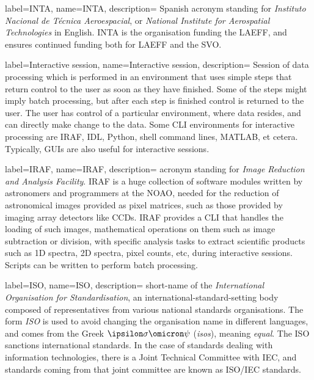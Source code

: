 {
    label={INTA},
    name={INTA},
    description={
    	Spanish acronym standing for \emph{Instituto Nacional de
        Técnica Aeroespacial}, or \emph{National Institute for
        Aerospatial Technologies} in English. INTA is the organisation
        funding the \gls{LAEFF}, and ensures continued funding both for
        LAEFF and the \gls{SVO}.
    }
}

{
    label={Interactive session},
    name={Interactive session},
    description={
    	Session of data processing which is performed in an environment
        that uses simple steps that return control to the user as soon
        as they have finished. Some of the steps might imply \gls{batch
        processing}, but after each step is finished control is
        returned to the user. The user has control of a particular
        environment, where data resides, and can directly make change
        to the data. Some \gls{CLI} environments for interactive
        processing are \gls{IRAF}, \gls{IDL}, \gls{Python}, \gls{shell}
        command lines, \gls{MATLAB}, et cetera.
		Typically, \gls{GUI}s are also
        useful for interactive sessions.
    }
}

{
    label={IRAF},
    name={IRAF},
    description={
    	acronym standing for \emph{Image Reduction and Analysis
        Facility}. IRAF is a huge collection of software modules
        written by astronomers and programmers at the \gls{NOAO},
        needed for the \gls{reduction} of astronomical images provided
        as pixel matrices, such as those provided by imaging array
        detectors like CCDs. IRAF provides a \gls{CLI} that handles the
        loading of such images, mathematical operations on them such as
        image subtraction or division, with specific analysis tasks to
        extract scientific products such as 1D spectra, 2D spectra,
        pixel counts, etc, during \gls{interactive sessions}. Scripts
        can be written to perform \gls{batch processing}.
    }
}

{
    label={ISO},
    name={ISO},
    description={
    	short-name of the \emph{International Organisation for
        Standardisation}, an international-standard-setting body
        composed of representatives from various national standards
        organisations. The form \emph{ISO} is used to avoid changing
        the organisation name in different languages, and comes from
        the Greek $\ipsilon\sigma\omicron\psi$ (\emph{isos}), meaning
        \emph{equal}. The ISO sanctions international standards. In the
        case of standards dealing with information technologies, there
        is a Joint Technical Committee with \gls{IEC}, and standards
        coming from that joint committee are known as ISO/IEC
        standards.
    }
}

